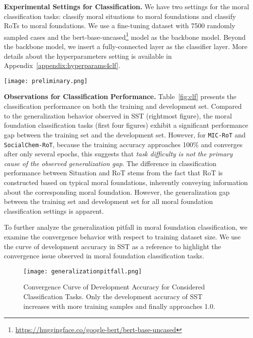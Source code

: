 \textbf{Experimental Settings for Classification.} 
We have two settings for the moral classification tasks: classify moral situations to moral foundations and classify RoTs to moral foundations.
We use a fine-tuning dataset with 7500 randomly sampled cases and the bert-base-uncased\footnote{\url{https://huggingface.co/google-bert/bert-base-uncased}} model as the backbone model.
Beyond the backbone model, we insert a fully-connected layer as the classifier layer. More details about the hyperparameters setting is available in Appendix~\ref{appendix:hyperparams4clf}.
\begin{figure*}[t]
    \centering
    \texttt{[image: preliminary.png]}
    \caption{\small Training and Development Accuracy Over 10 Fine-tuning Epochs. The first four figures display results for moral foundation classification tasks, while the rightmost figure shows the results for the SST benchmark.}
    \label{fig:clf}
\end{figure*}

\textbf{Observations for Classification Performance.} Table~\ref{fig:clf} presents the classification performance on both the training and development set. 
Compared to the generalization behavior observed in SST (rightmost figure), the moral foundation classification tasks (first four figures) exhibit a significant performance gap between the training set and the development set. 
However, for \texttt{MIC-RoT} and \texttt{SocialChem-RoT}, because the training accuracy approaches 100\% and converges after only several epochs, this suggests that \textit{task difficulty is not the primary cause of the observed generalization gap}.
The difference in classification performance between Situation and RoT stems from the fact that RoT is constructed based on typical moral foundations, inherently conveying information about the corresponding moral foundation. However, the generalization gap between the training set and development set for all moral foundation classification settings is apparent.

To further analyze the generalization pitfall in moral foundation classification, we examine the convergence behavior with respect to training dataset size. 
We use the curve of development accuracy in SST as a reference to highlight the convergence issue observed in moral foundation classification tasks.
\begin{figure}[h]
    \centering
    \texttt{[image: generalizationpitfall.png]}
    \caption{\small Convergence Curve of Development Accuracy for Considered Classification Tasks. Only the development accuracy of SST increases with more training samples and finally approaches 1.0.}
    \label{fig:convergence}
\end{figure}


